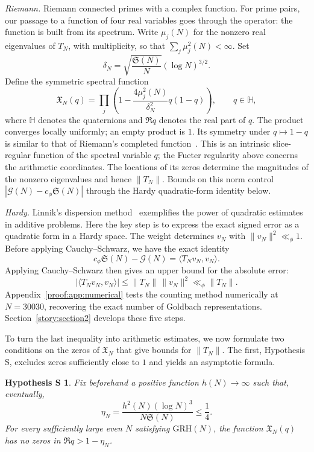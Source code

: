 \documentclass[12pt,a4paper]{amsart}
\numberwithin{equation}{section}
\def\le{\leqslant}
\theoremstyle{plain}
\newtheorem*{hypothesisS}{Hypothesis S}
\theoremstyle{definition}
\theoremstyle{remark}
\begin{document}
\emph{Riemann.} Riemann connected primes with a complex function.
For prime pairs, our passage to a function of four real variables
goes through the operator: the function is built from its spectrum.
Write $\mu_j(N)$ for the nonzero real eigenvalues of $T_N$,
with multiplicity, so that $\sum_j\mu_j^2(N)<\infty$. Set
\begin{equation}\label{v3i:spectral-scale}
 \delta_N=\sqrt{\frac{\mathfrak S(N)}N}(\log N)^{3/2}.
\end{equation}
Define the symmetric spectral function
\begin{equation}\label{qp:spectral-function}
 \mathfrak X_N(q)=
 \prod_j\left(1-\frac{4\mu_j^2(N)}{\delta_N^2}q(1-q)\right),
 \qquad q\in\mathbb H,
\end{equation}
where $\mathbb H$ denotes the quaternions and $\Re q$ denotes
the real part of $q$. The product converges locally uniformly; an empty
product is $1$. Its symmetry under $q\mapsto1-q$ is similar to that of
Riemann's completed function~\cite{Riemann1859}.
This is an intrinsic slice-regular function of the
spectral variable $q$; the Fueter regularity above concerns the
arithmetic coordinates. The locations of its zeros determine the
magnitudes of the nonzero eigenvalues and hence $\|T_N\|$.
Bounds on this norm control $|\mathcal G(N)-c_\phi\mathfrak S(N)|$
through the Hardy quadratic-form identity below.

\emph{Hardy.} Linnik's dispersion method~\cite{Linnik1963}
exemplifies the power of quadratic estimates in additive problems.
Here the key step is to express the exact signed error
as a quadratic form in a Hardy space. The weight determines $v_N$ with
$\|v_N\|^2\ll_\phi1$. Before applying Cauchy--Schwarz, we have the exact identity
\[
 c_\phi\mathfrak S(N)-\mathcal G(N)=\langle T_Nv_N,v_N\rangle.
\]
Applying Cauchy--Schwarz then gives an upper bound for the absolute error:
\[
 |\langle T_Nv_N,v_N\rangle|
 \le\|T_N\|\,\|v_N\|^2\ll_\phi\|T_N\|.
\]
Appendix~\ref{proof:app:numerical} tests the counting method numerically
at $N=30030$, recovering the exact number of Goldbach representations.
Section~\ref{story:section2} develops these five steps.

To turn the last inequality into arithmetic estimates, we now
formulate two conditions on the zeros of $\mathfrak X_N$ that
give bounds for $\|T_N\|$. The first, Hypothesis S, excludes zeros
sufficiently close to $1$ and yields an asymptotic formula.

\begin{hypothesisS}
Fix beforehand a positive function $h(N)\to\infty$ such that,
eventually,
\begin{equation}\label{v3i:S-width}
 \eta_N=\frac{h^2(N)(\log N)^3}{N\mathfrak S(N)}\le\frac14.
\end{equation}
For every sufficiently large even $N$ satisfying
$\mathrm{GRH}(N)$, the function $\mathfrak X_N(q)$ has no
zeros in $\Re q>1-\eta_N$.
\end{hypothesisS}
\end{document}
